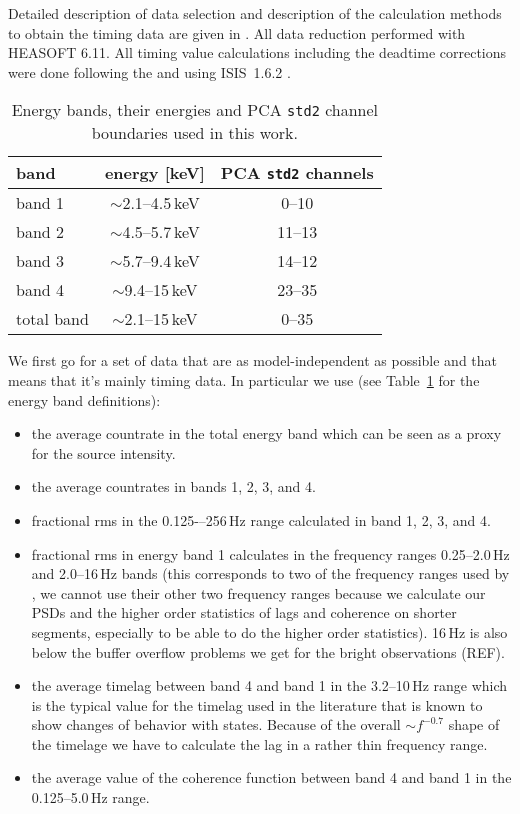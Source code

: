 \documentclass{aa}
\begin{document}
Detailed description of data selection and description of the
calculation methods to obtain the timing data are given in
\citep{Grinberg_2014a}. All data reduction performed with HEASOFT
6.11. All timing value calculations including the deadtime corrections
were done following the \citet{Nowak_1999a} and
\citet{Pottschmidt_2003b} using ISIS~1.6.2
\citep{Houck_Denicola_2000a,Houck_2002,Noble_Nowak_2008a}.

\begin{table}
\caption{Energy bands, their energies and PCA \texttt{std2}
  channel boundaries used in this work.}\label{tab:channels}
\begin{tabular}{lcc}
\hline\hline
band &energy [keV]& PCA \texttt{std2}
  channels\\
\hline
band 1 &$\sim$2.1--4.5\,keV& 0--10 \\
band 2 &$\sim$4.5--5.7\,keV& 11--13 \\
band 3 & $\sim$5.7--9.4\,keV& 14--12 \\
band 4 &$\sim$9.4--15\,keV& 23--35 \\
total band & $\sim$2.1--15\,keV & 0--35 \\
\hline
\end{tabular}
\end{table}


We first go for a set of data that are as model-independent as
possible and that means that it's mainly timing data. In particular we
use (see Table~\ref{tab:channels} for the energy band definitions):

\begin{itemize}
\item the average countrate in the total energy band which can be seen
  as a proxy for the source intensity.
\item the average countrates in bands 1, 2, 3, and 4.
\item fractional rms in the 0.125-–256\,Hz range calculated in
  band 1, 2, 3, and 4.
\item fractional rms in energy band 1 calculates in the frequency
  ranges 0.25--2.0\,Hz and 2.0--16\,Hz bands (this corresponds to two
  of the frequency ranges used by \citet{Heil_2015a}, we cannot use
  their other two frequency ranges because we calculate our PSDs and
  the higher order statistics of lags and coherence on shorter
  segments, especially to be able to do the higher order
  statistics). 16\,Hz is also below the buffer overflow problems we
  get for the bright observations (REF).
\item the average timelag between band 4 and band 1 in the 3.2--10\,Hz
  range which is the typical value for the timelag used in the
  literature that is known to show changes of behavior with
  states. Because of the overall $\sim f^{-0.7}$ shape of the timelage
  we have to calculate the lag in a rather thin frequency range.
\item the average value of the coherence function between band 4 and
  band 1 in the 0.125--5.0\,Hz range.
\end{itemize}
\end{document}
